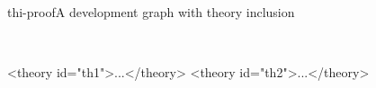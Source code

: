 \begin{myfig}{thi-proof}{A development graph with theory inclusion}
  \scriptsize%
 \begin{center}
\\[1ex]\baselineskip=8pt
\begin{boxedverbatim}
<theory id="th1">...</theory>     <theory id="th2">...</theory> 


\end{boxedverbatim}
\end{center}
\end{myfig}
